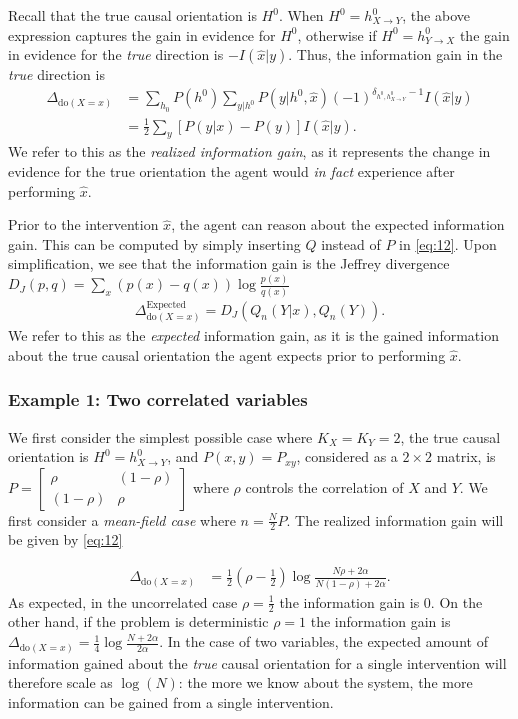 \documentclass[letterpaper]{article} %
\newcommand{\doo}{\textrm{do}}
\begin{document}
Recall that the true causal orientation is $H^0$. When $H^0 = h^0_{X \rightarrow Y}$, the above expression captures the gain in evidence for $H^0$, otherwise if $H^0 = h^0_{Y \rightarrow X}$ the gain in evidence for the \emph{true} direction is $-I(\hat x | y)$. Thus, the information gain in the \emph{true} direction is
\begin{align}
\Delta_{ \doo(X=x) } & = \sum_{h_0} P(h^0) \sum_{y | h^0} P(y | h^0, \hat x ) (-1)^{ \delta_{h^0, h^0_{X \rightarrow Y} } - 1 } I(\hat x | y) \nonumber \\
& = \frac{1}{2} \sum_{y} \left[P(y | x) - P(y)   \right]  I(\hat x | y).   \label{eq:12}
\end{align}
We refer to this as the \emph{realized information gain}, as it represents the change in evidence for the true orientation the agent would \emph{in fact} experience after performing $\hat x$.

Prior to the intervention $\hat x$, the agent can reason about the expected information gain. This can be computed by simply inserting $Q$ instead of $P$ in \cref{eq:12}. Upon simplification, we see that the information gain is the Jeffrey divergence $D_J(p,q) = \sum_{x} (p(x)-q(x))\log \frac{p(x)}{q(x)}$
\begin{align}
\Delta^\text{Expected}_{\doo(X=x)} = D_J( Q_n(Y | x), Q_n(Y) ).
\label{eq:9}
\end{align}
We refer to this as the \emph{expected} information gain, as it is the gained information about the true causal orientation the agent expects prior to performing $\hat x$.



\subsubsection{Example 1: Two correlated variables}
We first consider the simplest possible case where $K_X = K_Y = 2$, the true causal orientation is $H^0 = h^0_{X\rightarrow Y}$, and $P(x,y)=P_{xy}$, considered as a $2 \times 2$ matrix, is
$ P = \begin{bmatrix}
\rho  & (1-\rho) \\
(1-\rho) & \rho
\end{bmatrix} $
where $\rho$ controls the correlation of $X$ and $Y$. We first consider a \emph{mean-field case} where $n = \frac{N}{2}P$. The realized information gain will be given by \cref{eq:12}

\begin{align}
\Delta_{\doo(X=x) } & = \frac{1}{2}
(\rho-\frac{1}{2} ) \log \frac{ N \rho + 2\alpha }{ N(1-\rho) + 2\alpha }. %
\end{align}
As expected, in the uncorrelated case $\rho= \frac{1}{2}$ the information gain is 0. On the other hand, if the problem is deterministic $\rho = 1$ the information gain is $\Delta_{\doo(X=x) } = \frac{1}{4}\log \frac{ N + 2\alpha }{ 2\alpha}$. In the case of two variables, the expected amount of information gained about the \emph{true} causal orientation for a single intervention will therefore scale as $\log(N)$: the more we know about the system, the more information can be gained from a single intervention.
\end{document}
